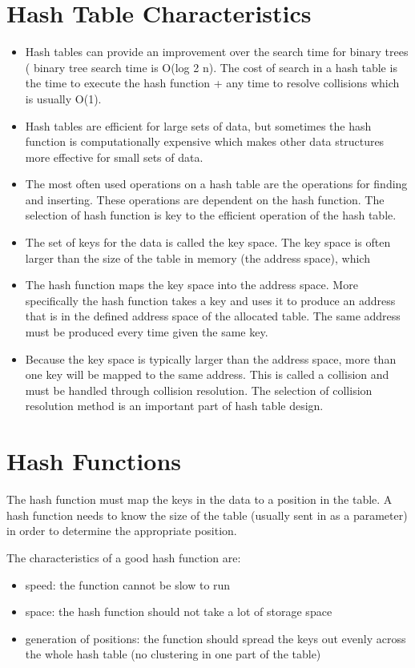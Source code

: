 \section{Hash Table Characteristics}

\begin{itemize}
\item Hash tables can provide an improvement over the search time for binary trees ( binary tree search time is O(log 2 n).     The cost of search in a hash table is the time to execute the hash function + any time to resolve collisions which is usually O(1).
\item Hash tables are efficient for large sets of data, but sometimes the hash function is computationally expensive which makes other data structures more effective for small sets of data.
\item The most often used operations on a hash table are the operations for finding and inserting.   These operations are dependent on the hash function.   The selection of hash function is key to the efficient operation of the hash table.
\item The set of keys for the data is called the key space.   The key space is often larger than the size of the table in memory (the address space), which \item The hash function maps the key space into the address space.   More specifically the hash function takes a key and uses it to produce an address that is in the defined address space of the allocated table.   The same address must be produced every time given the same key.
\item Because the key space is typically larger than the address space, more than one key will be mapped to the same address.   This is called a collision and must be handled through collision resolution. The selection of collision resolution method is an important part of hash table design.
\end{itemize}


\section{Hash Functions}

The hash function must map the keys in the data to a position in the table.   A hash function needs to know the size of the table (usually sent in as a parameter) in order to determine the appropriate position.
     
The characteristics of a good hash function are:
\begin{itemize}
\item speed: the function cannot be slow to run
\item space: the hash function should not take a lot of storage space
\item generation of positions: the function should spread the keys out evenly across the whole hash table (no clustering in one part of the table)
\end{itemize}

